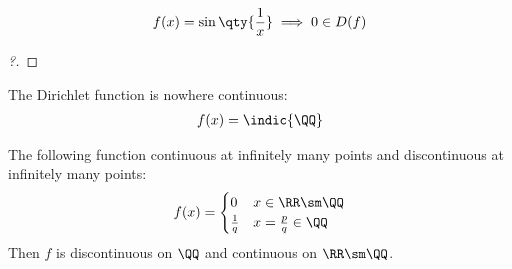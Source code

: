 \begin{example}

\begin{align*}
f(x) = \sin\qty{ \frac{1}{x} } \implies 0\in D(f)
\end{align*}

\end{example}

\begin{proof}[?]


\end{proof}

\begin{example}

The Dirichlet function is nowhere continuous:
\begin{align*}
f(x) = \indic{\QQ}
\end{align*}

\end{example}

\begin{proposition}

The following function continuous at infinitely many points and
discontinuous at infinitely many points:
\begin{align*}
f(x) = 
\begin{cases}
0 & x\in\RR\sm\QQ \\
\frac{1}{q} & x = \frac{p}{q} \in \QQ
\end{cases}
\end{align*} Then \(f\) is discontinuous on \(\QQ\) and continuous on
\(\RR\sm\QQ\).

\end{proposition}


